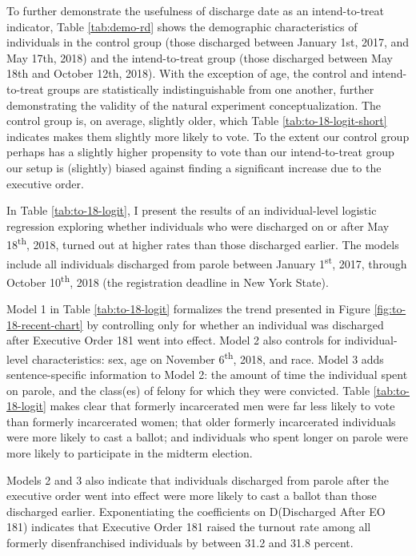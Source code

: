 \documentclass[
  12pt,
]{article}
\begin{document}
To further demonstrate the usefulness of discharge date as an intend-to-treat indicator, Table \ref{tab:demo-rd} shows the demographic characteristics of individuals in the control group (those discharged between January 1st, 2017, and May 17th, 2018) and the intend-to-treat group (those discharged between May 18th and October 12th, 2018). With the exception of age, the control and intend-to-treat groups are statistically indistinguishable from one another, further demonstrating the validity of the natural experiment conceptualization. The control group is, on average, slightly older, which Table \ref{tab:to-18-logit-short} indicates makes them slightly more likely to vote. To the extent our control group perhaps has a slightly higher propensity to vote than our intend-to-treat group our setup is (slightly) biased against finding a significant increase due to the executive order.



In Table \ref{tab:to-18-logit}, I present the results of an individual-level logistic regression exploring whether individuals who were discharged on or after May 18\textsuperscript{th}, 2018, turned out at higher rates than those discharged earlier. The models include all individuals discharged from parole between January 1\textsuperscript{st}, 2017, through October 10\textsuperscript{th}, 2018 (the registration deadline in New York State).



Model 1 in Table \ref{tab:to-18-logit} formalizes the trend presented in Figure \ref{fig:to-18-recent-chart} by controlling only for whether an individual was discharged after Executive Order 181 went into effect. Model 2 also controls for individual-level characteristics: sex, age on November 6\textsuperscript{th}, 2018, and race. Model 3 adds sentence-specific information to Model 2: the amount of time the individual spent on parole, and the class(es) of felony for which they were convicted. Table \ref{tab:to-18-logit} makes clear that formerly incarcerated men were far less likely to vote than formerly incarcerated women; that older formerly incarcerated individuals were more likely to cast a ballot; and individuals who spent longer on parole were more likely to participate in the midterm election.

Models 2 and 3 also indicate that individuals discharged from parole after the executive order went into effect were more likely to cast a ballot than those discharged earlier. Exponentiating the coefficients on D(Discharged After EO 181) indicates that Executive Order 181 raised the turnout rate among all formerly disenfranchised individuals by between 31.2 and 31.8 percent.
\end{document}
